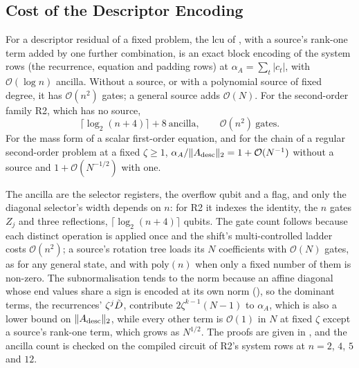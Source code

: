 
\subsection{Cost of the Descriptor Encoding}
\label{sec:descriptor-cost}

\begin{proposition}
\label{prop:descriptor-cost}
For a descriptor residual of a fixed problem, the \gls{lcu} of , with a source's rank-one term added by one further combination, is an exact block encoding of the system rows (the recurrence, equation and padding rows) at $\alpha_A=\sum_t|c_t|$, with $\mathcal{O}(\log n)$ ancilla. Without a source, or with a polynomial source of fixed degree, it has $\mathcal{O}(n^2)$ gates; a general source adds $\mathcal{O}(N)$. For the second-order family R2, which has no source,
\begin{equation}
    \lceil \log_2(n+4) \rceil + 8\ \text{ancilla},
    \qquad
    \mathcal{O}(n^2)\ \text{gates} .
    \label{eq:descriptor-cost}
\end{equation}
For the mass form of a scalar first-order equation, and for the chain of a regular second-order problem at a fixed $\zeta\ge1$, $\alpha_A/\|A_{\mathrm{desc}}\|_2=1+\mathcal{O}(N^{-1})$ without a source and $1+\mathcal{O}(N^{-1/2})$ with one.
\end{proposition}

The ancilla are the selector registers, the overflow qubit and a flag, and only the diagonal selector's width depends on $n$: for R2 it indexes the identity, the $n$ gates $Z_j$ and three reflections, $\lceil\log_2(n+4)\rceil$ qubits. The gate count follows because each distinct operation is applied once and the shift's multi-controlled ladder costs $\mathcal{O}(n^2)$; a source's rotation tree loads its $N$ coefficients with $\mathcal{O}(N)$ gates, as for any general state, and with $\mathrm{poly}(n)$ when only a fixed number of them is non-zero. The subnormalisation tends to the norm because an affine diagonal whose end values share a sign is encoded at its own norm (), so the dominant terms, the recurrences' $\zeta^j\tilde{D}$, contribute $2\zeta^{k-1}(N-1)$ to $\alpha_A$, which is also a lower bound on $\|A_{\mathrm{desc}}\|_2$, while every other term is $\mathcal{O}(1)$ in $N$ at fixed $\zeta$ except a source's rank-one term, which grows as $N^{1/2}$. The proofs are given in , and the ancilla count is checked on the compiled circuit of R2's system rows at $n=2$, $4$, $5$ and $12$.

